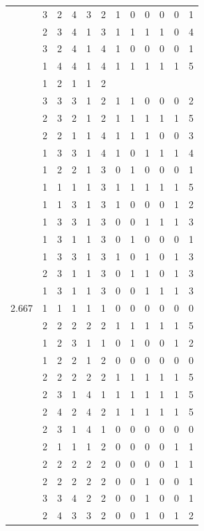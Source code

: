 \documentclass[]{book}
\theoremstyle{definition}
\theoremstyle{definition}
\theoremstyle{definition}
\theoremstyle{remark}
\begin{document}
\begin{table}
{\begin{tabular}[t]{rrrrrrrrrrrr}
 & 3 & 2 & 4 & 3 & 2 & 1 & 0 & 0 & 0 & 0 & 1\\
 & 2 & 3 & 4 & 1 & 3 & 1 & 1 & 1 & 1 & 0 & 4\\
 & 3 & 2 & 4 & 1 & 4 & 1 & 0 & 0 & 0 & 0 & 1\\
 & 1 & 4 & 4 & 1 & 4 & 1 & 1 & 1 & 1 & 1 & 5\\
 & 1 & 2 & 1 & 1 & 2 &  &  &  &  &  & \\
 & 3 & 3 & 3 & 1 & 2 & 1 & 1 & 0 & 0 & 0 & 2\\
 & 2 & 3 & 2 & 1 & 2 & 1 & 1 & 1 & 1 & 1 & 5\\
 & 2 & 2 & 1 & 1 & 4 & 1 & 1 & 1 & 0 & 0 & 3\\
 & 1 & 3 & 3 & 1 & 4 & 1 & 0 & 1 & 1 & 1 & 4\\
 & 1 & 2 & 2 & 1 & 3 & 0 & 1 & 0 & 0 & 0 & 1\\
 & 1 & 1 & 1 & 1 & 3 & 1 & 1 & 1 & 1 & 1 & 5\\
 & 1 & 1 & 3 & 1 & 3 & 1 & 0 & 0 & 0 & 1 & 2\\
 & 1 & 3 & 3 & 1 & 3 & 0 & 0 & 1 & 1 & 1 & 3\\
 & 1 & 3 & 1 & 1 & 3 & 0 & 1 & 0 & 0 & 0 & 1\\
 & 1 & 3 & 3 & 1 & 3 & 1 & 0 & 1 & 0 & 1 & 3\\
 & 2 & 3 & 1 & 1 & 3 & 0 & 1 & 1 & 0 & 1 & 3\\
 & 1 & 3 & 1 & 1 & 3 & 0 & 0 & 1 & 1 & 1 & 3\\
2.667 & 1 & 1 & 1 & 1 & 1 & 0 & 0 & 0 & 0 & 0 & 0\\
 & 2 & 2 & 2 & 2 & 2 & 1 & 1 & 1 & 1 & 1 & 5\\
 & 1 & 2 & 3 & 1 & 1 & 0 & 1 & 0 & 0 & 1 & 2\\
 & 1 & 2 & 2 & 1 & 2 & 0 & 0 & 0 & 0 & 0 & 0\\
 & 2 & 2 & 2 & 2 & 2 & 1 & 1 & 1 & 1 & 1 & 5\\
 & 2 & 3 & 1 & 4 & 1 & 1 & 1 & 1 & 1 & 1 & 5\\
 & 2 & 4 & 2 & 4 & 2 & 1 & 1 & 1 & 1 & 1 & 5\\
 & 2 & 3 & 1 & 4 & 1 & 0 & 0 & 0 & 0 & 0 & 0\\
 & 2 & 1 & 1 & 1 & 2 & 0 & 0 & 0 & 0 & 1 & 1\\
 & 2 & 2 & 2 & 2 & 2 & 0 & 0 & 0 & 0 & 1 & 1\\
 & 2 & 2 & 2 & 2 & 2 & 0 & 0 & 1 & 0 & 0 & 1\\
 & 3 & 3 & 4 & 2 & 2 & 0 & 0 & 1 & 0 & 0 & 1\\
 & 2 & 4 & 3 & 3 & 2 & 0 & 0 & 1 & 0 & 1 & 2\\

\end{tabular}}
\end{table}
\end{document}
